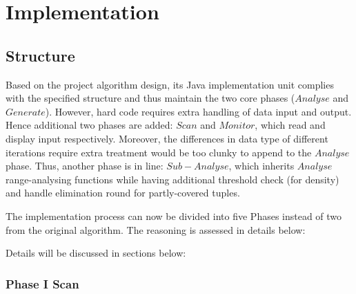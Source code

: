 \chapter{Implementation}

\section{Structure}
Based on the project algorithm design, its Java implementation unit complies with the specified structure and thus maintain the two core phases ($Analyse$ and $Generate$). However, hard code requires extra handling of data input and output. Hence additional two phases are added: $Scan$ and $Monitor$, which read and display input respectively. Moreover, the differences in data type of different iterations require extra treatment would be too clunky to append to the $Analyse$ phase. Thus, another phase is in line: $Sub-Analyse$, which inherits $Analyse$ range-analysing functions while having additional threshold check (for density) and handle elimination round for partly-covered tuples.  

The implementation process can now be divided into five Phases instead of two from the original algorithm. The reasoning is assessed in details below:



Details will be discussed in sections below:


\subsection{Phase I Scan}

